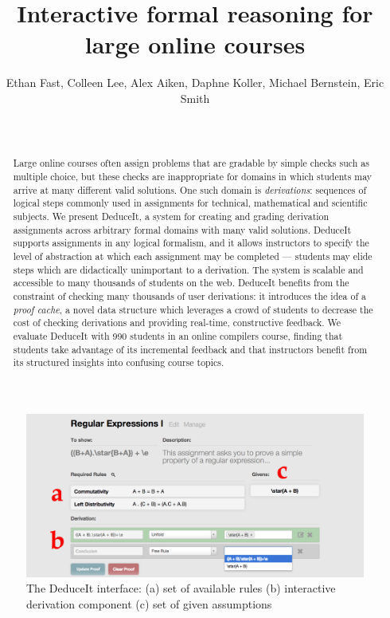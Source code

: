 \documentclass{sigchi}
\begin{document}
\title{Interactive formal reasoning for large online courses}

\author{
  \alignauthor Ethan Fast, Colleen Lee, Alex Aiken, Daphne Koller, Michael Bernstein, Eric Smith\\
    \\
    \\
}

\maketitle

\begin{figure}[ht!]
\centering
\includegraphics[width=1\textwidth]{splash3}
\caption{The DeduceIt interface: (a) set of available rules (b) interactive derivation component (c) set of given assumptions}
\label{fig:splash}
\end{figure}

\begin{abstract}
Large online courses often assign problems that are gradable by simple checks such as multiple choice, but these checks are inappropriate for domains in which students may arrive at many different valid solutions. One such domain is \emph{derivations}: sequences of logical steps commonly used in assignments for technical, mathematical and scientific subjects. We present DeduceIt, a system for creating and grading derivation assignments across arbitrary formal domains with many valid solutions. DeduceIt supports assignments in any logical formalism, and it allows instructors to specify the level of abstraction at which each assignment may be completed --- students may elide steps which are didactically unimportant to a derivation. The system is scalable and accessible to many thousands of students on the web. DeduceIt benefits from the constraint of checking many thousands of user derivations: it introduces the idea of a \textit{proof cache}, a novel data structure which leverages a crowd of students to decrease the cost of checking derivations and providing real-time, constructive feedback. We evaluate DeduceIt with 990 students in an online compilers course, finding that students take advantage of its incremental feedback and that instructors benefit from its structured insights into confusing course topics.
\end{abstract}
\end{document}
